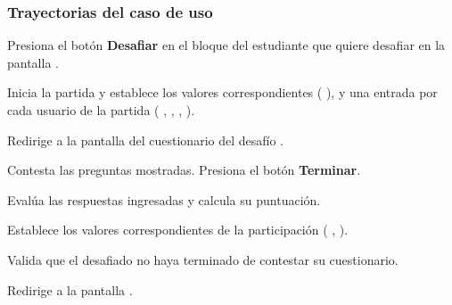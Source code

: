\begin{UseCase}
{	}








\end{UseCase}

\subsubsection{Trayectorias del caso de uso}

\begin{UCtrayectoria}%
%

    \Actor Presiona el botón {\bf Desafiar} en el bloque del estudiante que quiere desafiar en la pantalla .

    \Sistema Inicia la partida y establece los valores correspondientes (  ), y una entrada por cada usuario de la partida  ( , , ,  ).

    \Sistema Redirige a la pantalla del cuestionario del desafío .

    \Actor Contesta las preguntas mostradas. 
    \label{CU-C10-contesta-cuestionario}
    \Actor Presiona el botón {\bf Terminar}.

    \Sistema Evalúa las respuestas ingresadas y calcula su puntuación.

    \Sistema Establece los valores correspondientes de la participación  (
    ,
    ).

    \Sistema Valida que el  desafiado no haya terminado de contestar su cuestionario. 

    \Sistema Redirige a la pantalla .

\end{UCtrayectoria}

